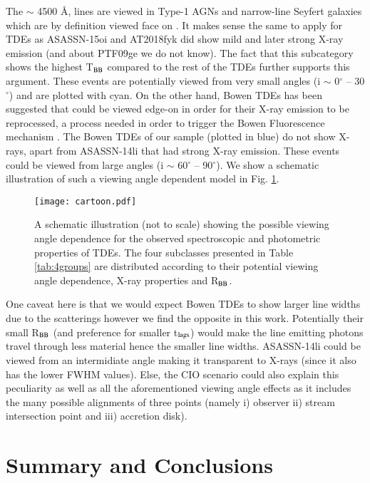 \documentclass[structabstract]{aa}
\begin{document}
The $\sim$ 4500 \AA,  lines are viewed in Type-1 AGNs and narrow-line Seyfert galaxies which are by definition viewed face on \citep{Antonucci1993}. It makes sense the same to apply for TDEs as ASASSN-15oi and AT2018fyk did show mild and later strong X-ray emission (and about PTF09ge we do not know). The fact that this subcategory shows the highest T$_{\rm BB}$ compared to the rest of the TDEs further supports this argument. These events are potentially viewed from very small angles (i $\sim$ 0$^{\circ}$ -- 30$^{\circ}$) and are plotted with cyan. On the other hand, Bowen  TDEs has been suggested that could be viewed edge-on in order for their X-ray emission to be reprocessed, a process needed in order to trigger the Bowen Fluorescence mechanism \citep{Leloudas2019}. The  Bowen TDEs of our sample (plotted in blue) do not show X-rays, apart from ASASSN-14li that had strong X-ray emission. These events could be viewed from large angles (i $\sim$ 60$^{\circ}$ -- 90$^{\circ}$). We show a schematic illustration of such a viewing angle dependent model in Fig. \ref{fig:schematic}.

\begin{figure}
\centering
\texttt{[image: cartoon.pdf]}
\caption{A schematic  illustration (not to scale) showing the possible viewing angle dependence for the observed spectroscopic and photometric properties of TDEs. The four subclasses presented in Table \ref{tab:4groups} are distributed according to their potential viewing angle dependence, X-ray properties and R$_{\rm BB}$.}
\label{fig:schematic}
\end{figure}

One caveat here is that we would expect  Bowen TDEs to show larger line widths due to the scatterings however we find the opposite in this work. Potentially their small R$_{\rm BB}$ (and preference for smaller t$_{\rm lags}$) would make the line emitting photons travel through less material hence the smaller line widths. ASASSN-14li could be viewed from an intermidiate angle making it transparent to X-rays (since it also has the lower FWHM values). Else, the CIO scenario could also explain this peculiarity  as well as all the aforementioned viewing angle effects as it includes the many possible alignments of three points (namely i) observer ii) stream intersection point and iii) accretion disk).

\section{Summary and Conclusions} \label{sec:conclusion}
\end{document}
